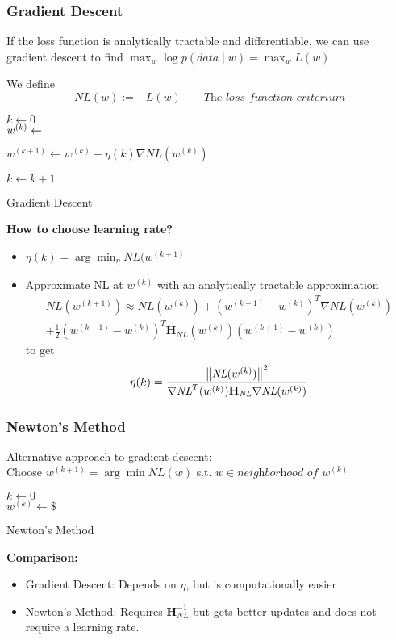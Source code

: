 \subsubsection{Gradient Descent}
If the loss function is analytically tractable and differentiable, we can use gradient descent to find $\max_w \log p(data\mid w) = \max_w L(w)$

We define 
$$
	\textit{NL}(w) := -L(w) \quad\quad \textit{The loss function criterium}
$$

\begin{algorithm}[H]  
	$k\gets 0$ \\
	$w^{(k)} \gets \empty $\\
   {
      $w^{(k+1)} \gets w^{(k)} - \eta(k)\nabla \textit{NL}(w^{(k)})$
      
      $k\gets k+1$ 
  	}
  \caption{Gradient Descent}
\end{algorithm}

\textbf{How to choose learning rate?}
\begin{itemize}
	\item $\eta(k) = \arg\min_\eta \textit{NL}(w^{(k+1)}$
	\item Approximate NL at $w^{(k)}$ with an analytically tractable approximation
	\begin{multline*}
		\textit{NL}(w^{(k+1)}) \approx \textit{NL}(w^{(k)}) + (w^{(k+1)} - w^{(k)})^T\nabla\textit{NL}(w^{(k)})  \\		
			+	\frac{1}{2} (w^{(k+1)} - w^{(k)})^T\mathbf H_{\textit{NL}}(w^{(k)})(w^{(k+1)} - w^{(k)})
	\end{multline*}
	to get 
	$$
		\eta(k) = \frac{\left\lVert\textit{NL}(w^{(k)})\right\rVert^2}{\nabla \textit{NL}^T(w^{(k)}) \mathbf H_{\textit{NL}}\nabla\textit{NL}(w^{(k)})}
	$$
	
\end{itemize}

\subsubsection{Newton's Method}
Alternative approach to gradient descent:\\ Choose $w^{(k+1)} =\arg\min \textit{NL}(w)$ s.t. $w\in\textit{neighborhood of } w^{(k)}$

\begin{algorithm}[H]  
	$k\gets 0$ \\
	$w^{(k)} \gets \$ $\\
  \caption{Newton's Method}
\end{algorithm}

\textbf{Comparison: }
\begin{itemize}
	\item Gradient Descent: Depends on $\eta$, but is computationally easier
	\item Newton's Method: Requires $\mathbf H^{-1}_{\textit{NL}}$ but gets better updates and does not require a learning rate.
\end{itemize}


